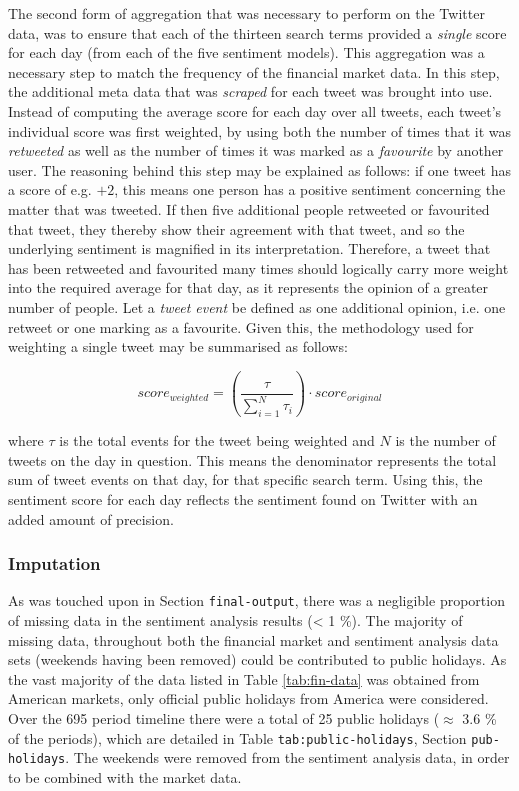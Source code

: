 \documentclass{article}
\begin{document}
The second form of aggregation that was necessary to perform on the Twitter data, was to ensure that each of the thirteen search terms provided a \emph{single} score for each day (from each of the five sentiment models). This aggregation was a necessary step to match the frequency of the financial market data. In this step, the additional meta data that was \emph{scraped} for each tweet was brought into use. Instead of computing the average score for each day over all tweets, each tweet's individual score was first weighted, by using both the number of times that it was \emph{retweeted} as well as the number of times it was marked as a \emph{favourite} by another user. The reasoning behind this step may be explained as follows: if one tweet has a score of e.g. $+2$, this means one person has a positive sentiment concerning the matter that was tweeted. If then five additional people retweeted or favourited that tweet, they thereby show their agreement with that tweet, and so the underlying sentiment is magnified in its interpretation. Therefore, a tweet that has been retweeted and favourited many times should logically carry more weight into the required average for that day, as it represents the opinion of a greater number of people. Let a \emph{tweet event} be defined as one additional opinion, i.e. one retweet or one marking as a favourite. Given this, the methodology used for weighting a single tweet may be summarised as follows:

\begin{equation}
  score_{weighted} = \left( \frac {\tau }{ \sum_{i = 1}^{N} \tau_{i} } \right) \cdot score_{original}
  \label{eqn-reweight}
\end{equation}

\vspace{3mm}

where $\tau$ is the total events for the tweet being weighted and $N$ is the number of tweets on the day in question. This means the denominator represents the total sum of tweet events on that day, for that specific search term. Using this, the sentiment score for each day reflects the sentiment found on Twitter with an added amount of precision.


\subsubsection{Imputation \label{imputation}}
\label{sec-1-2-2}

As was touched upon in Section \texttt{final-output}, there was a negligible proportion of missing data in the sentiment analysis results (< 1 \%). The majority of missing data, throughout both the financial market and sentiment analysis data sets (weekends having been removed) could be contributed to public holidays. As the vast majority of the data listed in Table \ref{tab:fin-data} was obtained from American markets, only official public holidays from America were considered. Over the 695 period timeline there were a total of 25 public holidays ($\approx$ 3.6 \% of the periods), which are detailed in Table \texttt{tab:public-holidays}, Section \texttt{pub-holidays}. The weekends were removed from the sentiment analysis data, in order to be combined with the market data.
\end{document}
